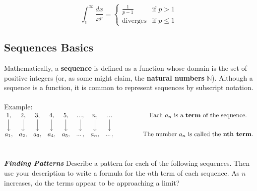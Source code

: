 \documentclass[addpoints, 12pt]{exam}
\begin{document}
\begin{tcolorbox}[title= A SPECIAL IMPROPER INTEGRAL,colframe=black,sharp corners,colback=white,colbacktitle=white,coltitle=black]

    \[\int_1^\infty\frac{dx}{x^p}=
    \begin{cases}
        \frac{1}{p-1} & \text{if }p>1\\
        \text{diverges} & \text{if }p\le1
    \end{cases}\]

\end{tcolorbox}


\newpage
{}
\subsection*{Sequences Basics}
Mathematically, a \textbf{sequence} is defined as a function whose domain is the set of positive integers (or, as some might claim, the \textbf{natural numbers} $\mathbb{N}$). Although a sequence is a function, it is common to represent sequences by subscript notation.\\ \\
Example:
$\begin{matrix}
     1, & 2, & 3, & 4, & 5, & ... , & n, & ... & \hspace{.5in}\text{Each }a_{n}\text{ is a }\textbf{term}\text{ of the sequence}.\\
     \Big\downarrow & \Big\downarrow & \Big\downarrow & \Big\downarrow & \Big\downarrow & \Big\downarrow & \Big\downarrow & \Big\downarrow &   \\
     a_{1}, & a_{2}, & a_{3}, & a_{4}, & a_{5}, & ...\, , & a_{n}, & ...\, , & \hspace{.5in}\text{The number }a_{n}\text{ is called the }\textbf{nth term}.
\end{matrix}$\\
\\
\\


\textbf{\textit{Finding Patterns}} Describe a pattern for each of the following sequences. Then use your description to write a formula for the $n$th term of each sequence. As $n$ increases, do the terms appear to be approaching a limit?\\ 
\end{document}
